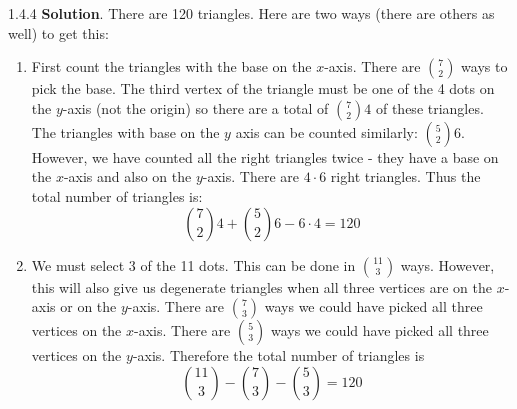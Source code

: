 \documentclass[11pt,]{book}
\theoremstyle{ptxplainnotitle}
\theoremstyle{ptxplaintitle}
\theoremstyle{ptxdefinitionnotitle}
\theoremstyle{ptxdefinitiontitle}
\theoremstyle{ptxdefinitionnotitle}
\theoremstyle{ptxdefinitiontitle}
\theoremstyle{ptxdefinitionnotitle}
\theoremstyle{ptxdefinitiontitle}
\theoremstyle{ptxdefinitiontitlenonumber}
\theoremstyle{ptxdefinitiontitlenonumber}
\numberwithin{equation}{chapter}
\begin{document}
\begin{divisionexercise}{1.4.4}
\textbf{Solution}.\quad%
\hypertarget{p-1608}{}%
There are 120 triangles. Here are two ways (there are others as well) to get this:%
\leavevmode%
\begin{enumerate}[label=(\alph*)]
\item\hypertarget{li-697}{}\hypertarget{p-1609}{}%
First count the triangles with the base on the \(x\)-axis. There are \({7 \choose 2}\) ways to pick the base. The third vertex of the triangle must be one of the 4 dots on the \(y\)-axis (not the origin) so there are a total of \({7 \choose 2}4\) of these triangles. The triangles with base on the \(y\) axis can be counted similarly: \({5 \choose 2}6\). However, we have counted all the right triangles twice - they have a base on the \(x\)-axis and also on the \(y\)-axis. There are \(4 \cdot 6\) right triangles. Thus the total number of triangles is:%
\begin{equation*}
{7 \choose 2}4 + {5 \choose 2}6 - 6\cdot 4 = 120
\end{equation*}
%
\item\hypertarget{li-698}{}\hypertarget{p-1610}{}%
We must select 3 of the 11 dots. This can be done in \({11 \choose 3}\) ways. However, this will also give us degenerate triangles when all three vertices are on the \(x\)-axis or on the \(y\)-axis. There are \({7 \choose 3}\) ways we could have picked all three vertices on the \(x\)-axis. There are \({5 \choose 3}\) ways we could have picked all three vertices on the \(y\)-axis. Therefore the total number of triangles is%
\begin{equation*}
{11 \choose 3} - {7 \choose 3} - {5 \choose 3} = 120
\end{equation*}
%
\end{enumerate}
\end{divisionexercise}%
\end{document}
